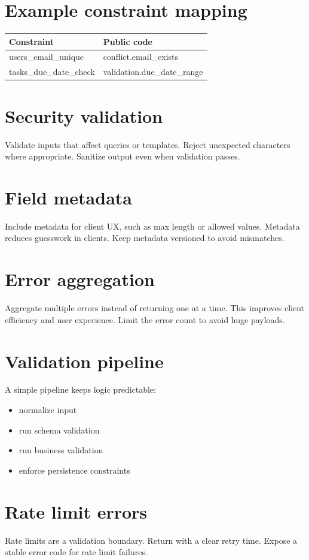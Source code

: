 \section{Example constraint mapping}
\begin{tabularx}{\textwidth}{@{}lX@{}}
\toprule
Constraint & Public code \\
\midrule
users\_email\_unique & conflict.email\_exists \\
tasks\_due\_date\_check & validation.due\_date\_range \\
\bottomrule
\end{tabularx}

\section{Security validation}
Validate inputs that affect queries or templates.
Reject unexpected characters where appropriate.
Sanitize output even when validation passes.

\section{Field metadata}
Include metadata for client UX, such as max length or allowed values.
Metadata reduces guesswork in clients.
Keep metadata versioned to avoid mismatches.

\section{Error aggregation}
Aggregate multiple errors instead of returning one at a time.
This improves client efficiency and user experience.
Limit the error count to avoid huge payloads.

\section{Validation pipeline}
A simple pipeline keeps logic predictable:
\begin{itemize}[nosep]
  \item normalize input
  \item run schema validation
  \item run business validation
  \item enforce persistence constraints
\end{itemize}

\section{Rate limit errors}
Rate limits are a validation boundary.
Return  with a clear retry time.
Expose a stable error code for rate limit failures.

